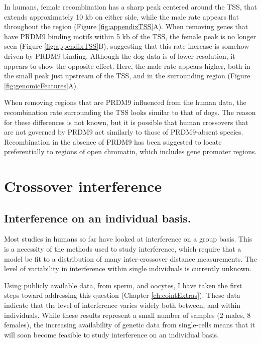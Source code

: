 In humans, female recombination has a sharp peak centered around the TSS, that extends approximately 10 kb on either side, while the male rate appears flat throughout the region (Figure \ref{fig:appendixTSS}A).
When removing genes that have PRDM9 binding motifs within 5 kb of the TSS, the female peak is no longer seen (Figure \ref{fig:appendixTSS}B), suggesting that this rate increase is somehow driven by PRDM9 binding.
Although the dog data is of lower resolution, it appears to show the opposite effect.
Here, the male rate appears higher, both in the small peak just upstream of the TSS, and in the surrounding region (Figure \ref{fig:genomicFeatures}A).

When removing regions that are PRDM9 influenced from the human data, the recombination rate surrounding the TSS looks similar to that of dogs.
The reason for these differences is not known, but it is possible that human crossovers that are not governed by PRDM9 act similarly to those of PRDM9-absent species.
Recombination in the absence of PRDM9 has been suggested to locate preferentially to regions of open chromatin, which includes gene promoter regions\cite{Auton2013,Singhal2015,Lam2015}.

\section{Crossover interference}

\subsection{Interference on an individual basis.}

Most studies in humans so far have looked at interference on a group basis.
This is a necessity of the methods used to study interference, which require that a model be fit to a distribution of many inter-crossover distance measurements.
The level of variability in interference within single individuals is currently unknown.

Using publicly available data, from sperm\cite{Wang2012,Lu2012}, and oocytes\cite{Hou2013}, I have taken the first steps toward addressing this question (Chapter \ref{ch:cointExtras}).
These data indicate that the level of interference varies widely both between, and within individuals.
While these results represent a small number of samples (2 males, 8 females), the increasing availability of genetic data from single-cells means that it will soon become feasible to study interference on an individual basis.


